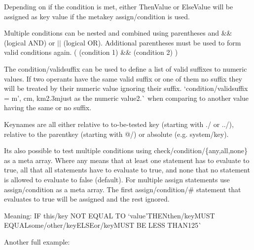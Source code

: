 Depending on if the condition is met, either \textquotesingle{}Then\+Value\textquotesingle{} or \textquotesingle{}Else\+Value\textquotesingle{} will be assigned as key value if the metakey {\ttfamily assign/condition} is used.

Multiple conditions can be nested and combined using parentheses and {\ttfamily \&\&} (logical A\+ND) or {\ttfamily $\vert$$\vert$} (logical OR). Additional parentheses must be used to form valid conditions again. {\ttfamily (} {\ttfamily (condition 1) \&\& (condition 2)} {\ttfamily )}

The {\ttfamily condition/validsuffix} can be used to define a list of valid suffixes to numeric values. If two operants have the same valid suffix or one of them no suffix they will be treated by their numeric value ignoring their suffix. `condition/validsuffix = \textquotesingle{}m', \textquotesingle{}cm\textquotesingle{}, \textquotesingle{}km2.\+3m{\ttfamily just as the numeric value}2.\`{} when comparing to another value having the same or no suffix.

Keynames are all either relative to to-\/be-\/tested key (starting with {\ttfamily ./} or {\ttfamily ../}), relative to the parentkey (starting with {\ttfamily @/}) or absolute (e.\+g. {\ttfamily system/key}).

It\textquotesingle{}s also possible to test multiple conditions using {\ttfamily check/condition/\{any,all,none\}} as a meta array. Where {\ttfamily any} means that at least one statement has to evaluate to true, {\ttfamily all} that all statements have to evaluate to true, and {\ttfamily none} that no statement is allowed to evaluate to false (default). For multiple assign statements use {\ttfamily assign/condition} as a meta array. The first {\ttfamily assign/condition/\#} statement that evaluates to true will be assigned and the rest ignored.


\begin{DoxyCode}{0}
\end{DoxyCode}


Meaning\+: IF {\ttfamily this/key} N\+OT E\+Q\+U\+AL TO `\textquotesingle{}value'{\ttfamily T\+H\+EN}then/key{\ttfamily M\+U\+ST E\+Q\+U\+AL}some/other/key{\ttfamily E\+L\+SE}or/key{\ttfamily M\+U\+ST BE L\+E\+SS T\+H\+AN}125\`{}

Another full example\+:


\begin{DoxyCode}{0}
\DoxyCodeLine{}
\DoxyCodeLine{}
\DoxyCodeLine{}
\DoxyCodeLine{}
\end{DoxyCode}


